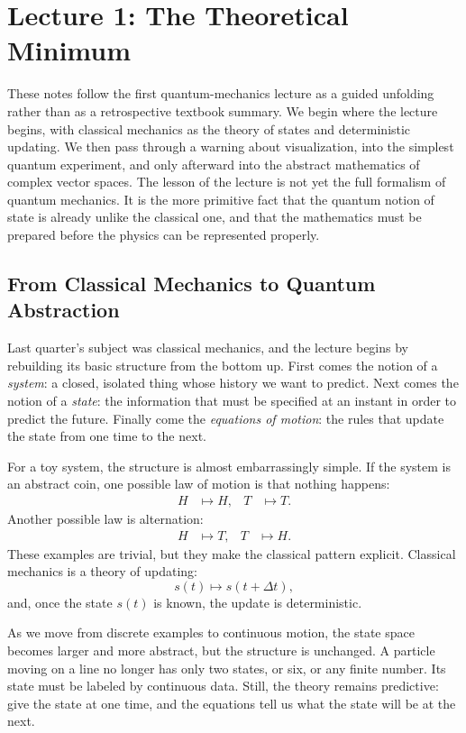 \chapter{Lecture 1: The Theoretical Minimum}

These notes follow the first quantum-mechanics lecture as a guided unfolding rather than as a retrospective textbook summary. We begin where the lecture begins, with classical mechanics as the theory of states and deterministic updating. We then pass through a warning about visualization, into the simplest quantum experiment, and only afterward into the abstract mathematics of complex vector spaces. The lesson of the lecture is not yet the full formalism of quantum mechanics. It is the more primitive fact that the quantum notion of state is already unlike the classical one, and that the mathematics must be prepared before the physics can be represented properly.

\section{From Classical Mechanics to Quantum Abstraction}

Last quarter's subject was classical mechanics, and the lecture begins by rebuilding its basic structure from the bottom up. First comes the notion of a \emph{system}: a closed, isolated thing whose history we want to predict. Next comes the notion of a \emph{state}: the information that must be specified at an instant in order to predict the future. Finally come the \emph{equations of motion}: the rules that update the state from one time to the next.

For a toy system, the structure is almost embarrassingly simple. If the system is an abstract coin, one possible law of motion is that nothing happens:
\begin{align}
H &\longmapsto H,
&
T &\longmapsto T.
\end{align}
Another possible law is alternation:
\begin{align}
H &\longmapsto T,
&
T &\longmapsto H.
\end{align}
These examples are trivial, but they make the classical pattern explicit. Classical mechanics is a theory of updating:
\begin{equation}
s(t)\longmapsto s(t+\Delta t),
\end{equation}
and, once the state \(s(t)\) is known, the update is deterministic.

As we move from discrete examples to continuous motion, the state space becomes larger and more abstract, but the structure is unchanged. A particle moving on a line no longer has only two states, or six, or any finite number. Its state must be labeled by continuous data. Still, the theory remains predictive: give the state at one time, and the equations tell us what the state will be at the next.

